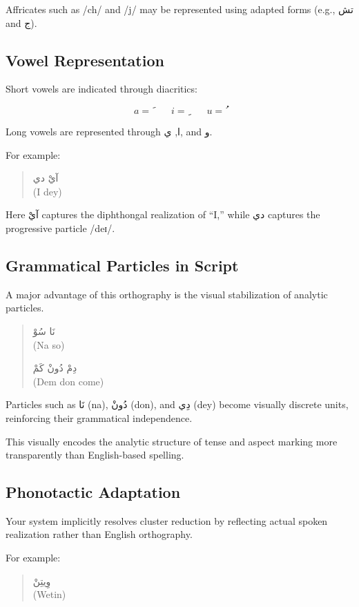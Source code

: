 \documentclass[12pt]{article}
\begin{document}
Affricates such as /ch/ and /j/ may be represented using adapted forms (e.g., تش and ج).

\subsection{Vowel Representation}

Short vowels are indicated through diacritics:

\[
a = َ \qquad
i = ِ \qquad
u = ُ
\]

Long vowels are represented through ا, ي, and و.

For example:

\begin{quote}
آيْ دي \\
(I dey)
\end{quote}

Here آيْ captures the diphthongal realization of “I,” while دي captures the progressive particle /deɪ/.

\subsection{Grammatical Particles in Script}

A major advantage of this orthography is the visual stabilization of analytic particles.

\begin{quote}
نَا سُوْ \\
(Na so)

دِمْ دُونْ كَمْ \\
(Dem don come)
\end{quote}

Particles such as نَا (na), دُونْ (don), and دِي (dey) become visually discrete units, reinforcing their grammatical independence.

This visually encodes the analytic structure of tense and aspect marking more transparently than English-based spelling.

\subsection{Phonotactic Adaptation}

Your system implicitly resolves cluster reduction by reflecting actual spoken realization rather than English orthography.

For example:

\begin{quote}
وِيتِنْ \\
(Wetin)
\end{quote}
\end{document}

